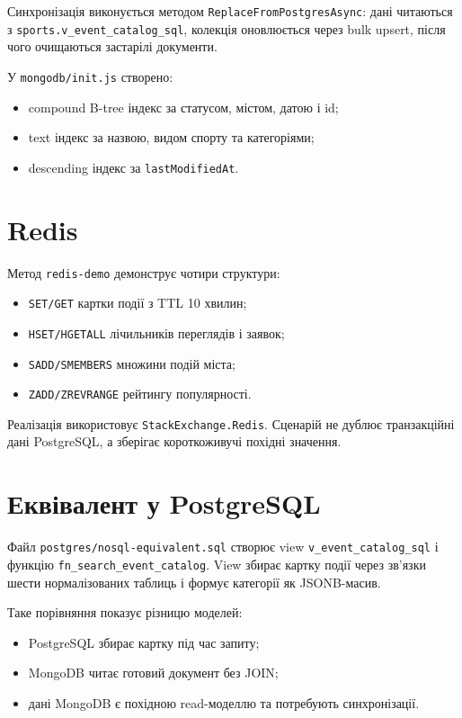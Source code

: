 \documentclass[12pt,a4paper]{article}
\begin{document}
Синхронізація виконується методом \texttt{ReplaceFromPostgresAsync}: дані читаються з \texttt{sports.v\_event\_catalog\_sql}, колекція оновлюється через bulk upsert, після чого очищаються застарілі документи.

У \texttt{mongodb/init.js} створено:

\begin{itemize}
\item compound B-tree індекс за статусом, містом, датою і id;
\item text індекс за назвою, видом спорту та категоріями;
\item descending індекс за \texttt{lastModifiedAt}.
\end{itemize}

\section{Redis}

Метод \texttt{redis-demo} демонструє чотири структури:

\begin{itemize}
\item \texttt{SET/GET} картки події з TTL 10 хвилин;
\item \texttt{HSET/HGETALL} лічильників переглядів і заявок;
\item \texttt{SADD/SMEMBERS} множини подій міста;
\item \texttt{ZADD/ZREVRANGE} рейтингу популярності.
\end{itemize}

Реалізація використовує \texttt{StackExchange.Redis}. Сценарій не дублює транзакційні дані PostgreSQL, а зберігає короткоживучі похідні значення.

\section{Еквівалент у PostgreSQL}

Файл \texttt{postgres/nosql-equivalent.sql} створює view \texttt{v\_event\_catalog\_sql} і функцію \texttt{fn\_search\_event\_catalog}. View збирає картку події через зв'язки шести нормалізованих таблиць і формує категорії як JSONB-масив.

Таке порівняння показує різницю моделей:

\begin{itemize}
\item PostgreSQL збирає картку під час запиту;
\item MongoDB читає готовий документ без JOIN;
\item дані MongoDB є похідною read-моделлю та потребують синхронізації.
\end{itemize}
\end{document}
